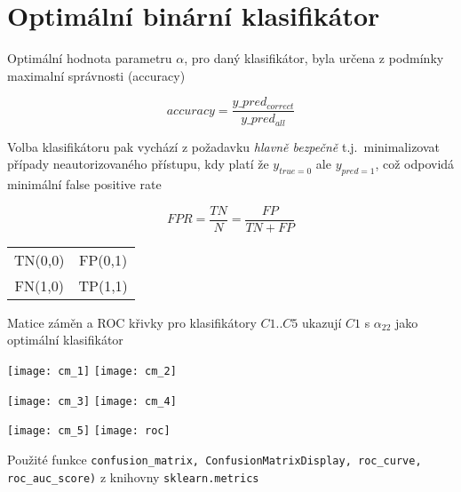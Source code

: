 \documentclass[11pt]{article}
\begin{document}
    \section{Optimální binární klasifikátor}\label{sec:opt_clf}
    Optimální hodnota parametru  $\alpha$, pro daný klasifikátor,
    byla určena z podmínky maximalní správnosti (accuracy)

    \begin{equation}
        accuracy = \frac{y\_pred_{correct}}{y\_pred_{all}}\label{eq:accuracy}
    \end{equation}

    Volba klasifikátoru pak vychází z požadavku {\em hlavně bezpečně} t.j.\
    minimalizovat případy neautorizovaného přístupu, kdy platí že $y_{true = 0}$ ale $y_{pred = 1}$,
    což odpovidá minimální false positive rate

    \begin{equation}
        FPR = \frac{TN}{N}=\frac{FP}{TN + FP}\label{eq:fpr}
    \end{equation}

    \begin{center}
        \begin{tabular}{ c c }
            TN(0,0) & FP(0,1) \\
            FN(1,0) & TP(1,1) \\
        \end{tabular}
    \end{center}

    Matice záměn a ROC křivky pro klasifikátory $C1..C5$ ukazují $C1$ s $\alpha_{22}$ jako
    optimální klasifikátor

    \texttt{[image: cm\_1]}
    \texttt{[image: cm\_2]}

    \texttt{[image: cm\_3]}
    \texttt{[image: cm\_4]}

    \texttt{[image: cm\_5]}
    \texttt{[image: roc]}

    Použité funkce
    \texttt{confusion\_matrix, ConfusionMatrixDisplay, roc\_curve, roc\_auc\_score)}
    z knihovny \texttt{sklearn.metrics}
\end{document}
